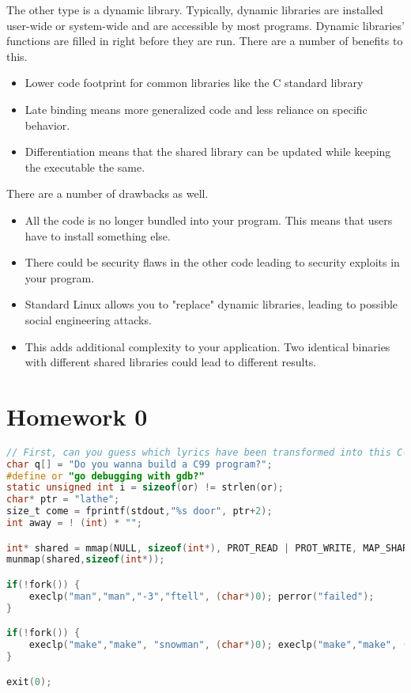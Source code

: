 The other type is a dynamic library.
Typically, dynamic libraries are installed user-wide or system-wide and are accessible by most programs.
Dynamic libraries' functions are filled in right before they are run.
There are a number of benefits to this.

\begin{itemize}
\item Lower code footprint for common libraries like the C standard library
\item Late binding means more generalized code and less reliance on specific behavior.
\item Differentiation means that the shared library can be updated while keeping the executable the same.
\end{itemize}

There are a number of drawbacks as well.

\begin{itemize}
\item All the code is no longer bundled into your program. This means that users have to install something else.
\item There could be security flaws in the other code leading to security exploits in your program.
\item Standard Linux allows you to "replace" dynamic libraries, leading to possible social engineering attacks.
\item This adds additional complexity to your application. Two identical binaries with different shared libraries could lead to different results.
\end{itemize}

\newpage

\section{Homework 0}

\begin{lstlisting}[language=C]
// First, can you guess which lyrics have been transformed into this C-like system code?
char q[] = "Do you wanna build a C99 program?";
#define or "go debugging with gdb?"
static unsigned int i = sizeof(or) != strlen(or);
char* ptr = "lathe";
size_t come = fprintf(stdout,"%s door", ptr+2);
int away = ! (int) * "";

int* shared = mmap(NULL, sizeof(int*), PROT_READ | PROT_WRITE, MAP_SHARED | MAP_ANONYMOUS, -1, 0);
munmap(shared,sizeof(int*));

if(!fork()) {
    execlp("man","man","-3","ftell", (char*)0); perror("failed");
}

if(!fork()) {
    execlp("make","make", "snowman", (char*)0); execlp("make","make", (char*)0));
}

exit(0);
\end{lstlisting}

